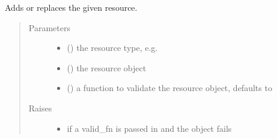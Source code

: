 \documentclass[letterpaper,10pt,english]{sphinxmanual}
\begin{document}
\begin{fulllineitems}
\begin{fulllineitems}
\label{\detokenize{autoapi/pine/client/client/index:pine.client.client.EveClient._add_or_replace_resource}}
Adds or replaces the given resource.
\begin{quote}\begin{description}
\item[{Parameters}] \leavevmode\begin{itemize}
\item {} 
 () \textendash{} the resource type, e.g. 

\item {} 
 () \textendash{} the resource object

\item {} 
 (\sphinxstyleliteralemphasis{\sphinxupquote{, }}) \textendash{} a function to validate the resource object, defaults to 

\end{itemize}

\item[{Raises}] \leavevmode\begin{itemize}
\item {} 
{\hyperref[\detokenize{autoapi/pine/client/exceptions/index:pine.client.exceptions.PineClientValueException}]{}} \textendash{} if a valid\_fn is passed in and the object fails


\end{itemize}
\end{description}
\end{quote}
\end{fulllineitems}
\end{fulllineitems}
\end{document}
